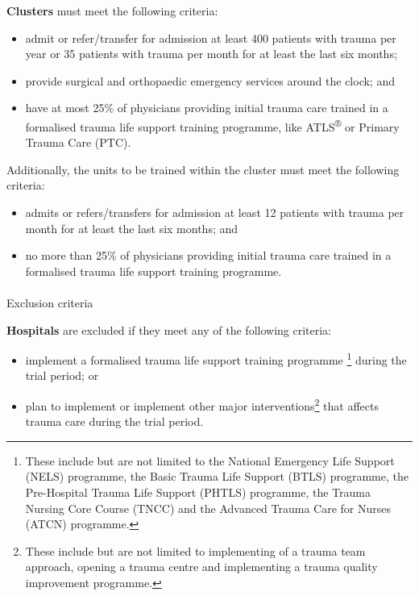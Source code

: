 \documentclass[
]{scrartcl}
\makeatletter
\let\oldparagraph\paragraph
\renewcommand{\paragraph}{
    \@ifstar
      \xxxParagraphStar
      \xxxParagraphNoStar
  }
\newcommand{\xxxParagraphStar}[1]{\oldparagraph*{#1}\mbox{}}
\newcommand{\xxxParagraphNoStar}[1]{\oldparagraph{#1}\mbox{}}
\providecommand{\tightlist}{%
  \setlength{\itemsep}{0pt}\setlength{\parskip}{0pt}}\usepackage{longtable,booktabs,array}
\makeatother
\begin{document}
\textbf{Clusters} must meet the following criteria:

\begin{itemize}
\tightlist
\item
  admit or refer/transfer for admission at least 400 patients with
  trauma per year or 35 patients with trauma per month for at least the
  last six months;
\item
  provide surgical and orthopaedic emergency services around the clock;
  and
\item
  have at most 25\% of physicians providing initial trauma care trained
  in a formalised trauma life support training programme, like
  ATLS\textsuperscript{®} or Primary Trauma Care (PTC).
\end{itemize}

Additionally, the units to be trained within the cluster must meet the
following criteria:

\begin{itemize}
\tightlist
\item
  admits or refers/transfers for admission at least 12 patients with
  trauma per month for at least the last six months; and
\item
  no more than 25\% of physicians providing initial trauma care trained
  in a formalised trauma life support training programme.
\end{itemize}

\paragraph{Exclusion criteria}\label{exclusion-criteria}

\textbf{Hospitals} are excluded if they meet any of the following
criteria:

\begin{itemize}
\tightlist
\item
  implement a formalised trauma life support training programme
  \footnote{These include but are not limited to the National Emergency
    Life Support (NELS) programme, the Basic Trauma Life Support (BTLS)
    programme, the Pre-Hospital Trauma Life Support (PHTLS) programme,
    the Trauma Nursing Core Course (TNCC) and the Advanced Trauma Care
    for Nurses (ATCN) programme.} during the trial period; or
\item
  plan to implement or implement other major interventions\footnote{These
    include but are not limited to implementing of a trauma team
    approach, opening a trauma centre and implementing a trauma quality
    improvement programme.} that affects trauma care during the trial
  period.
\end{itemize}
\end{document}
